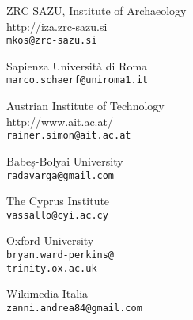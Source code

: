 \begin{contributors}
{  ZRC SAZU, Institute of Archaeology \\
{http://iza.zrc-sazu.si}	\\
\texttt{mkos@zrc-sazu.si	}
}


{Sapienza Università di Roma	   \\
\texttt{marco.schaerf@uniroma1.it	}
}
	

{  Austrian Institute of Technology \\
{http://www.ait.ac.at/}	\\
\texttt{rainer.simon@ait.ac.at}
}
	
		
		
		

{  Babeș-Bolyai University	 \\
\texttt{radavarga@gmail.com}}
		


{  The Cyprus Institute	 \\
\texttt{vassallo@cyi.ac.cy	}
}


{Oxford University	   \\
\texttt{bryan.ward-perkins@\\trinity.ox.ac.uk}
}



{ Wikimedia Italia	  \\
\texttt{zanni.andrea84@gmail.com}
}



		


\end{contributors}